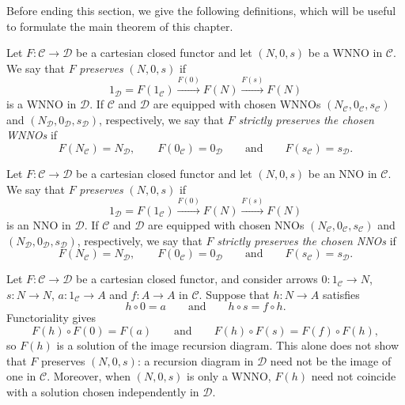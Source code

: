 Before ending this section, we give the following definitions, which will be useful to formulate the main theorem of this chapter.

\begin{definition}
    Let $F : \mathcal C \to \mathcal D$ be a cartesian closed functor and let $(N,0,s)$ be a WNNO in $\mathcal C$. We say that $F$ \emph{preserves} $(N,0,s)$ if
    \[ 1_{\mathcal D} = F(1_{\mathcal C}) \xrightarrow{F(0)} F(N) \xrightarrow{F(s)} F(N) \]
    is a WNNO in $\mathcal D$.
    If $\mathcal C$ and $\mathcal D$ are equipped with chosen WNNOs $(N_{\mathcal C},0_{\mathcal C},s_{\mathcal C})$ and $(N_{\mathcal D},0_{\mathcal D},s_{\mathcal D})$, respectively, we say that $F$ \emph{strictly preserves the chosen WNNOs} if
    \[ F(N_{\mathcal C}) = N_{\mathcal D}, \qquad F(0_{\mathcal C}) = 0_{\mathcal D} \qquad\text{and}\qquad F(s_{\mathcal C}) = s_{\mathcal D}. \]
\end{definition}

\begin{definition}
    Let $F : \mathcal C \to \mathcal D$ be a cartesian closed functor and let $(N,0,s)$ be an NNO in $\mathcal C$. We say that $F$ \emph{preserves} $(N,0,s)$ if
    \[ 1_{\mathcal D} = F(1_{\mathcal C}) \xrightarrow{F(0)} F(N) \xrightarrow{F(s)} F(N) \]
    is an NNO in $\mathcal D$.
    If $\mathcal C$ and $\mathcal D$ are equipped with chosen NNOs $(N_{\mathcal C},0_{\mathcal C},s_{\mathcal C})$ and $(N_{\mathcal D},0_{\mathcal D},s_{\mathcal D})$, respectively, we say that $F$ \emph{strictly preserves the chosen NNOs} if
    \[ F(N_{\mathcal C}) = N_{\mathcal D}, \qquad F(0_{\mathcal C}) = 0_{\mathcal D} \qquad\text{and}\qquad F(s_{\mathcal C}) = s_{\mathcal D}. \]
\end{definition}

\begin{remark}
    Let $F : \mathcal C \to \mathcal D$ be a cartesian closed functor, and consider arrows $0 : 1_{\mathcal C} \to N$, $s : N \to N$, $a : 1_{\mathcal C} \to A$ and $f : A \to A$ in $\mathcal C$. Suppose that $h : N \to A$ satisfies
    \[ h \circ 0 = a \qquad\text{and}\qquad h \circ s = f \circ h. \]
    Functoriality gives
    \[ F(h) \circ F(0) = F(a) \qquad\text{and}\qquad F(h) \circ F(s) = F(f) \circ F(h), \]
    so $F(h)$ is a solution of the image recursion diagram. This alone does not show that $F$ preserves $(N,0,s)$: a recursion diagram in $\mathcal D$ need not be the image of one in $\mathcal C$. Moreover, when $(N,0,s)$ is only a WNNO, $F(h)$ need not coincide with a solution chosen independently in $\mathcal D$.
\end{remark}

